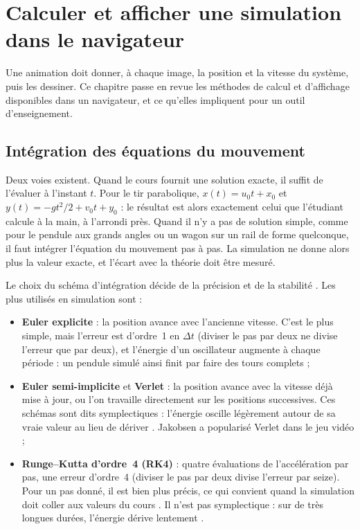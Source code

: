 
\chapter{Calculer et afficher une simulation dans le navigateur}\label{chap:numerique}

Une animation doit donner, à chaque image, la position et la vitesse du
système, puis les dessiner. Ce chapitre passe en revue les méthodes de calcul
et d'affichage disponibles dans un navigateur, et ce qu'elles impliquent pour
un outil d'enseignement.

\section{Intégration des équations du mouvement}

Deux voies existent. Quand le cours fournit une solution exacte, il suffit de
l'évaluer à l'instant \(t\). Pour le tir parabolique,
\(x(t) = u_0 t + x_0\) et \(y(t) = -g t^2/2 + v_0 t + y_0\) : le résultat est
alors exactement celui que l'étudiant calcule à la main, à l'arrondi près.
Quand il n'y a pas de solution simple, comme pour le pendule aux grands angles
ou un wagon sur un rail de forme quelconque, il faut intégrer l'équation du
mouvement pas à pas. La simulation ne donne alors plus la valeur exacte, et
l'écart avec la théorie doit être mesuré.

Le choix du schéma d'intégration décide de la précision et de la stabilité
\cite{butcher2016, hairer2006}. Les plus utilisés en simulation sont :
\begin{itemize}
  \item \textbf{Euler explicite} : la position avance avec l'ancienne
        vitesse. C'est le plus simple, mais l'erreur est d'ordre~1 en
        \(\Delta t\) (diviser le pas par deux ne divise l'erreur que par
        deux), et l'énergie d'un oscillateur augmente à chaque période : un
        pendule simulé ainsi finit par faire des tours complets ;
  \item \textbf{Euler semi-implicite} et \textbf{Verlet} : la position avance
        avec la vitesse déjà mise à jour, ou l'on travaille directement sur
        les positions successives. Ces schémas sont dits symplectiques :
        l'énergie oscille légèrement autour de sa vraie valeur au lieu de
        dériver \cite{verlet1967, hairer2006}. Jakobsen a popularisé Verlet
        dans le jeu vidéo \cite{jakobsen2001} ;
  \item \textbf{Runge--Kutta d'ordre~4 (RK4)} : quatre évaluations de
        l'accélération par pas, une erreur d'ordre~4 (diviser le pas par
        deux divise l'erreur par seize). Pour un pas donné, il est bien plus
        précis, ce qui convient quand la simulation doit coller aux valeurs
        du cours \cite{butcher2016}. Il n'est pas symplectique : sur de très
        longues durées, l'énergie dérive lentement \cite{hairer2006}.
\end{itemize}

